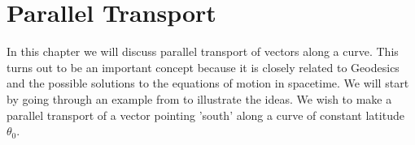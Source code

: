 \newcommand{\ia}{0.6} %
\newcommand{\ib}{0.0} %

\chapter{Parallel Transport}
\label{sec:parallel}

In this chapter we will discuss parallel transport of vectors along a curve. This turns out
to be an important concept because it is closely related to Geodesics and the possible
solutions to the equations of motion in spacetime. We will start by going through an example
from \cite{night} to illustrate the ideas. We wish to make a parallel transport of a vector 
pointing 'south' along a curve of constant latitude $\theta_0$. 

